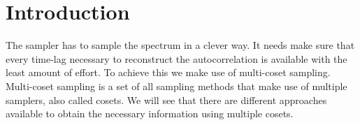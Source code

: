 \documentclass[a4paper, openany, oneside]{memoir}
\begin{document}
\section{Introduction}
The sampler has to sample the spectrum in a clever way. It needs make sure that every time-lag necessary to reconstruct the autocorrelation is available with the least amount of effort. To achieve this we make use of multi-coset sampling. Multi-coset sampling is a set of all sampling methods that make use of multiple samplers, also called cosets. We will see that there are different approaches available to obtain the necessary information using multiple cosets.
\end{document}
